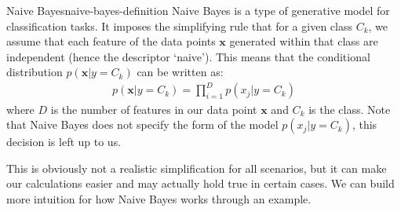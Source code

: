 \begin{definition}{Naive Bayes}{naive-bayes-definition}
	Naive Bayes is a type of generative model for classification tasks. It imposes the simplifying rule that for a given class $C_{k}$, we assume that each feature of the data points $\textbf{x}$ generated within that class are independent (hence the descriptor `naive'). This means that the conditional distribution $p(\textbf{x} | y = C_{k})$ can be written as:
	\begin{align*}
		p(\textbf{x} | y = C_{k}) = \prod_{i = 1}^{D} p(x_{j} | y = C_{k})
	\end{align*}
	where $D$ is the number of features in our data point $\textbf{x}$ and $C_{k}$ is the class. Note that Naive Bayes does not specify the form of the model $p(x_{j} | y = C_{k})$, this decision is left up to us.
\end{definition}
This is obviously not a realistic simplification for all scenarios, but it can make our calculations easier and may actually hold true in certain cases. We can build more intuition for how Naive Bayes works through an example.

